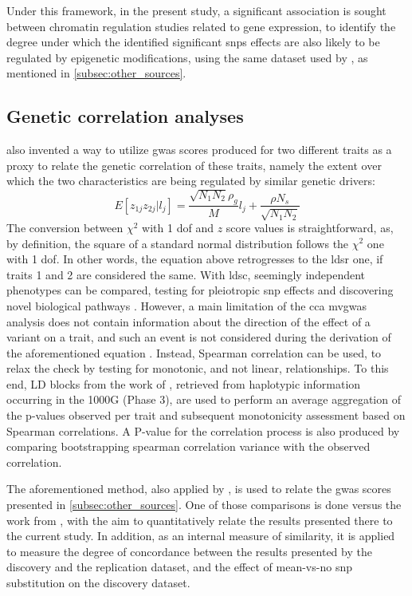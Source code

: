 Under this framework, in the present study, a significant association is sought between chromatin regulation studies related to gene expression, to identify the degree under which the identified significant \acp{snp} effects are also likely to be regulated by epigenetic modifications, using the same dataset used by \citet{Finucane2018}, as mentioned in \autoref{subsec:other_sources}.

\subsection{Genetic correlation analyses}
\label{subsec:gencorr}
\citet{Bulik-Sullivan2015_cor} also invented a way to utilize \ac{gwas} scores produced for two different traits as a proxy to relate the genetic correlation of these traits, namely the extent over which the two characteristics are being regulated by similar genetic drivers:
$$
E[z_{1j}z_{2j}|l_j] = \frac{\sqrt{N_1N_2}\rho_g}{M}l_j + \frac{\rho N_s}{\sqrt{N_1N_2}}
$$
The conversion between $\chi^2$ with 1 \ac{dof} and $z$ score values is straightforward, as, by definition, the square of a standard normal distribution follows the $\chi^2$ one with 1 \ac{dof}. In other words, the equation above retrogresses to the \ac{ldsr} one, if traits 1 and 2 are considered the same. With \ac{ldsc}, seemingly independent phenotypes can be compared, testing for pleiotropic \ac{snp} effects and discovering novel biological pathways \cite{Bulik-Sullivan2015_cor}. However, a main limitation of the \ac{cca} \ac{mvgwas} analysis does not contain information about the direction of the effect of a variant on a trait, and such an event is not considered during the derivation of the aforementioned equation \cite{Bulik-Sullivan2015}. Instead, Spearman correlation can be used, to relax the check by testing for monotonic, and not linear, relationships. To this end, LD blocks from the work of \citet{Berisa2016}, retrieved from haplotypic information occurring in the 1000G (Phase 3),  are used to perform an average aggregation of the p-values observed per trait and subsequent monotonicity assessment based on Spearman correlations. A P-value for the correlation process is also produced by comparing bootstrapping spearman correlation variance with the observed correlation.

The aforementioned method, also applied by \citet{Naqvi2021}, is used to relate the \ac{gwas} scores presented in \autoref{subsec:other_sources}. One of those comparisons is done versus the work from \citet{Sha2021}, with the aim to quantitatively relate the results presented there to the current study. In addition, as an internal measure of similarity, it is applied to measure the degree of concordance between the results presented by the discovery and the replication dataset, and the effect of mean-vs-no \ac{snp} substitution on the discovery dataset.  

